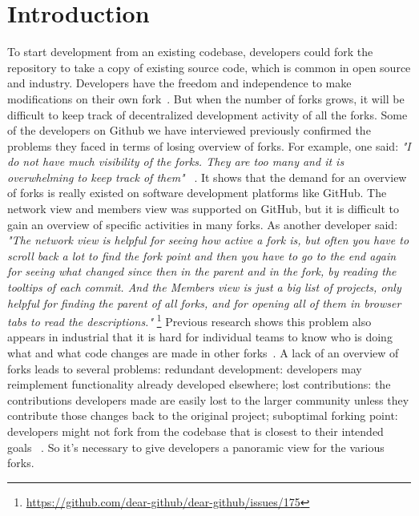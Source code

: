 \section{Introduction}
To start development from an existing codebase, developers could fork the repository to take a copy of existing source code, which is common in open source and industry. Developers have the freedom and independence to make modifications on their own fork~\cite{dubinsky2013exploratory, bitzer2006impact, ernst2010code,vetter2007open}. But when the number of forks grows, it will be difficult to keep track of decentralized development activity of all the forks. Some of the developers on Github we have interviewed previously confirmed the problems they faced in terms of losing overview of forks. For example, one said: \emph{"I do not have much visibility of the forks. They are too many and it is overwhelming to keep track of them"} ~\cite{ZSLXWK:ICSE18}. It shows that the demand for an overview of forks is really existed on software development platforms like GitHub. The network view and members view was supported on GitHub, but it is difficult to gain an overview of specific activities in many forks. As another developer said: \emph{"The network view is helpful for seeing how active a fork is, but often you have to scroll back a lot to find the fork point and then you have to go to the end again for seeing what changed since then in the parent and in the fork, by reading the tooltips of each commit. And the Members view is just a big list of projects, only helpful for finding the parent of all forks, and for opening all of them in browser tabs to read the descriptions."} \footnote{\url{https://github.com/dear-github/dear-github/issues/175}}
Previous research shows this problem also appears in industrial that it is hard for individual teams to know who is doing what and what code changes are made in other forks~\cite{berger2014three,Duc:2014:FCM:2652524.2652546}. A lack of an overview of forks leads to several problems: redundant development: developers may reimplement functionality already developed elsewhere; lost contributions: the contributions developers made are easily lost to the larger community unless they contribute those changes back to the original project; suboptimal forking point: developers might not fork from the codebase that is closest to their intended goals ~\cite{dubinsky2013exploratory,stanciulescu2015forked}. So it's necessary to give developers a panoramic view for the various forks.

